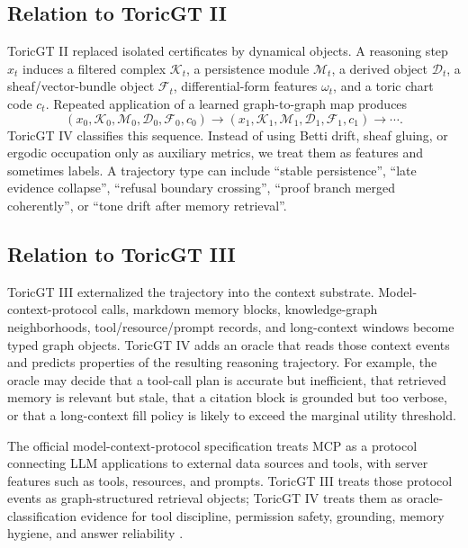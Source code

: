 \documentclass[11pt]{article}
\newcommand{\calD}{\mathcal{D}}
\newcommand{\calF}{\mathcal{F}}
\newcommand{\calK}{\mathcal{K}}
\newcommand{\calM}{\mathcal{M}}
\numberwithin{equation}{section}
\begin{document}
\subsection{Relation to ToricGT II}
ToricGT II replaced isolated certificates by dynamical objects. A reasoning step $x_t$ induces a filtered complex $\calK_t$, a persistence module $\calM_t$, a derived object $\calD_t$, a sheaf/vector-bundle object $\calF_t$, differential-form features $\omega_t$, and a toric chart code $c_t$. Repeated application of a learned graph-to-graph map produces
\begin{equation}
(x_0,\calK_0,\calM_0,\calD_0,\calF_0,c_0)\to (x_1,\calK_1,\calM_1,\calD_1,\calF_1,c_1)\to\cdots.
\end{equation}
ToricGT IV classifies this sequence. Instead of using Betti drift, sheaf gluing, or ergodic occupation only as auxiliary metrics, we treat them as features and sometimes labels. A trajectory type can include ``stable persistence'', ``late evidence collapse'', ``refusal boundary crossing'', ``proof branch merged coherently'', or ``tone drift after memory retrieval''.

\subsection{Relation to ToricGT III}
ToricGT III externalized the trajectory into the context substrate. Model-context-protocol calls, markdown memory blocks, knowledge-graph neighborhoods, tool/resource/prompt records, and long-context windows become typed graph objects. ToricGT IV adds an oracle that reads those context events and predicts properties of the resulting reasoning trajectory. For example, the oracle may decide that a tool-call plan is accurate but inefficient, that retrieved memory is relevant but stale, that a citation block is grounded but too verbose, or that a long-context fill policy is likely to exceed the marginal utility threshold.

The official model-context-protocol specification treats MCP as a protocol connecting LLM applications to external data sources and tools, with server features such as tools, resources, and prompts. ToricGT III treats those protocol events as graph-structured retrieval objects; ToricGT IV treats them as oracle-classification evidence for tool discipline, permission safety, grounding, memory hygiene, and answer reliability \cite{mcp2025}.
\end{document}
